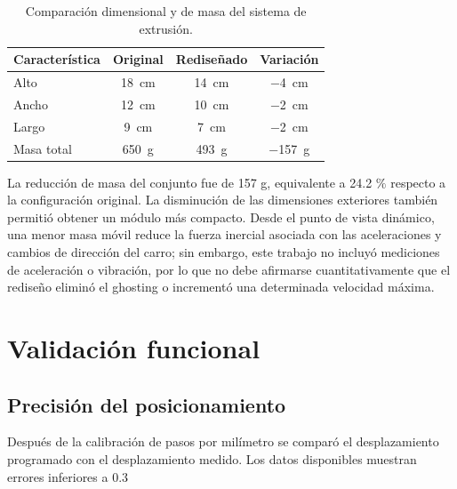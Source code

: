 \begin{table}[htbp]
    \centering
    \caption{Comparación dimensional y de masa del sistema de extrusión.}
    \label{tab:comparacion_extrusion2}
    \begin{tabular}{lccc}
        \toprule
        \textbf{Característica} & \textbf{Original} & 
        \textbf{Rediseñado} & \textbf{Variación} \\
        \midrule
        Alto          & \qty{18}{\cm} & \qty{14}{\cm} & \qty{-4}{\cm} \\
        Ancho         & \qty{12}{\cm} & \qty{10}{\cm} & \qty{-2}{\cm} \\
        Largo         & \qty{9}{\cm}  & \qty{7}{\cm}  & \qty{-2}{\cm} \\
        Masa total    & \qty{650}{\g} & \qty{493}{\g} & \qty{-157}{\g} \\

        \bottomrule
    \end{tabular}
\end{table}

La reducción de masa del conjunto fue de 157 g, equivalente a 24.2 $\%$ respecto a la configuración original. La disminución de las dimensiones exteriores también permitió obtener un módulo más compacto. Desde el punto de vista dinámico, una menor masa móvil reduce la fuerza inercial asociada con las aceleraciones y cambios de dirección del carro; sin embargo, este trabajo no incluyó mediciones de aceleración o vibración, por lo que no debe afirmarse cuantitativamente que el rediseño eliminó el ghosting o incrementó una determinada velocidad máxima.

\section{Validación funcional}
\label{sec:validacion_movimiento}
\subsection{Precisión del posicionamiento}
Después de la calibración de pasos por milímetro se comparó el desplazamiento programado con el desplazamiento medido. Los datos disponibles muestran errores inferiores a 0.3 %


